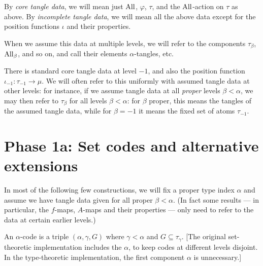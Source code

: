 \begin{definition}
  By \emph{core tangle data}, we will mean just $\mathrm{All}$, $\varphi$, $\tau$, and the $\mathrm{All}$-action on $\tau$ as above.  By \emph{incomplete tangle data}, we will mean all the above data except for the position functions $\iota$ and their properties.

  When we assume this data at multiple levels, we will refer to the components $\tau_\beta$, $\mathrm{All}_\beta$, and so on, and call their elements $\alpha$-tangles, etc.
\end{definition}

There is standard core tangle data at level $-1$, and also the position function $\iota_{-1} : \tau_{-1} \to \mu$.  We will often refer to this uniformly with assumed tangle data at other levels: for instance, if we assume tangle data at all \emph{proper} levels $\beta < \alpha$, we may then refer to $\tau_\beta$ for all levels $\beta < \alpha$: for $\beta$ proper, this means the tangles of the assumed tangle data, while for $\beta = -1$ it means the fixed set of atoms $\tau_{-1}$.

\section{Phase 1a: Set codes and alternative extensions}

In most of the following few constructions, we will fix a proper type index $\alpha$ and assume we have tangle data given for all proper $\beta < \alpha$. (In fact some results --- in particular, the $f$-maps, $A$-maps and their properties --- only need to refer to the data at certain earlier levels.)

\begin{definition}
\label {def:code}
\leanok
An $\alpha$-code is a triple $(\alpha,\gamma,G)$ where $\gamma<\alpha$ and $G \subseteq \tau_\gamma$. [The original set-theoretic implementation includes the $\alpha$, to keep codes at different levels disjoint.  In the type-theoretic implementation, the first component $\alpha$ is unnecessary.]
\end{definition}

